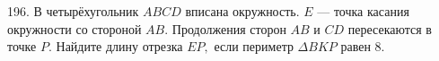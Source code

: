 196. В четырёхугольник $ABCD$ вписана окружность. $E$ --- точка касания окружности со стороной $AB.$ Продолжения сторон $AB$ и $CD$ пересекаются в точке $P.$ Найдите длину отрезка $EP,$ если периметр $\Delta BKP$ равен 8.\\
